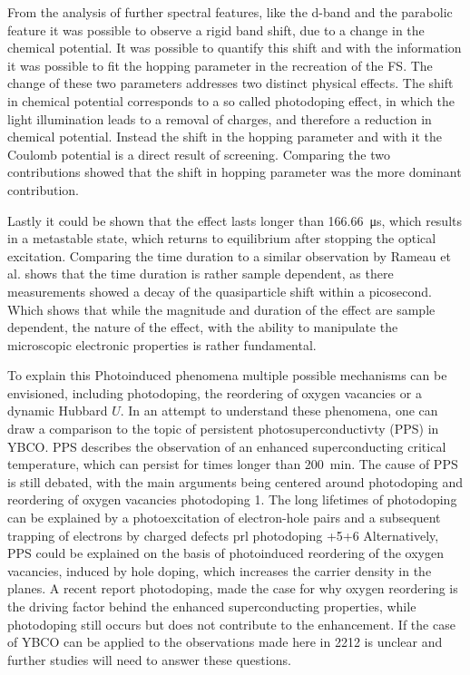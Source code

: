 From the analysis of further spectral features, like the  d-band and the parabolic feature it was possible to observe a rigid band shift, due to a change in the chemical potential.
It was possible to quantify this shift and with the information it was possible to fit the hopping parameter in the recreation of the FS.
The change of these two parameters addresses two distinct physical effects.
The shift in chemical potential corresponds to a so called photodoping effect, in which the light illumination leads to a removal of charges, and therefore a reduction in chemical potential.
Instead the shift in the hopping parameter and with it the Coulomb potential is a direct result of screening.
Comparing the two contributions showed that the shift in hopping parameter was the more dominant contribution.

Lastly it could be shown that the effect lasts longer than \qty{166.66}{\micro\second}, which results in a metastable state, which returns to equilibrium after stopping the optical excitation.
Comparing the time duration to a similar observation by Rameau et al. \cite{} shows that the time duration is rather sample dependent, as there measurements showed a decay of the quasiparticle shift within a picosecond.
Which shows that while the magnitude and duration of the effect are sample dependent, the nature of the effect, with the ability to manipulate the microscopic electronic properties is rather fundamental.

To explain this Photoinduced phenomena multiple possible mechanisms can be envisioned, including photodoping, the reordering of oxygen vacancies or a dynamic Hubbard $U$.
In an attempt to understand these phenomena, one can draw a comparison to the topic of persistent photosuperconductivty (PPS) in YBCO.
PPS describes the observation of an enhanced superconducting critical temperature, which can persist for times longer than \qty{200}{\minute}.
The cause of PPS is still debated, with the main arguments being centered around photodoping and reordering of oxygen vacancies \cite{} photodoping 1.
The long lifetimes of photodoping can be explained by a photoexcitation of electron-hole pairs and a subsequent trapping of electrons by charged defects \cite{} prl photodoping +5+6
Alternatively, PPS could be explained on the basis of photoinduced reordering of the oxygen vacancies, induced by hole doping, which increases the carrier density in the  planes.
A recent report \cite{} photodoping, made the case for why oxygen reordering is the driving factor behind the enhanced superconducting properties, while photodoping still occurs but does not contribute to the enhancement.
If the case of YBCO can be applied to the observations made here in 2212 is unclear and further studies will need to answer these questions.

